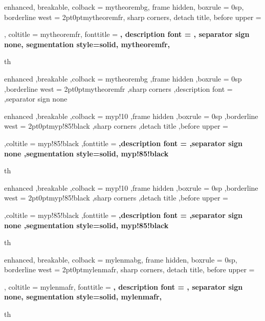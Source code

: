 {%
  enhanced,
  breakable,
  colback = mytheorembg,
  frame hidden,
  boxrule = 0sp,
  borderline west = {2pt}{0pt}{mytheoremfr},
  sharp corners,
  detach title,
  before upper = \tcbtitle\par\smallskip,
  coltitle = mytheoremfr,
  fonttitle = \bfseries\sffamily,
  description font = \mdseries,
  separator sign none,
  segmentation style={solid, mytheoremfr},
}
{th}


{%
  enhanced
  ,breakable
  ,colback = mytheorembg
  ,frame hidden
  ,boxrule = 0sp
  ,borderline west = {2pt}{0pt}{mytheoremfr}
  ,sharp corners
  ,description font = \mdseries
  ,separator sign none
}

{%
  enhanced
  ,breakable
  ,colback = myp!10
  ,frame hidden
  ,boxrule = 0sp
  ,borderline west = {2pt}{0pt}{myp!85!black}
  ,sharp corners
  ,detach title
  ,before upper = \tcbtitle\par\smallskip
  ,coltitle = myp!85!black
  ,fonttitle = \bfseries\sffamily
  ,description font = \mdseries
  ,separator sign none
  ,segmentation style={solid, myp!85!black}
}
{th}
{%
  enhanced
  ,breakable
  ,colback = myp!10
  ,frame hidden
  ,boxrule = 0sp
  ,borderline west = {2pt}{0pt}{myp!85!black}
  ,sharp corners
  ,detach title
  ,before upper = \tcbtitle\par\smallskip
  ,coltitle = myp!85!black
  ,fonttitle = \bfseries\sffamily
  ,description font = \mdseries
  ,separator sign none
  ,segmentation style={solid, myp!85!black}
}
{th}



{%
  enhanced,
  breakable,
  colback = mylenmabg,
  frame hidden,
  boxrule = 0sp,
  borderline west = {2pt}{0pt}{mylenmafr},
  sharp corners,
  detach title,
  before upper = \tcbtitle\par\smallskip,
  coltitle = mylenmafr,
  fonttitle = \bfseries\sffamily,
  description font = \mdseries,
  separator sign none,
  segmentation style={solid, mylenmafr},
}
{th}

